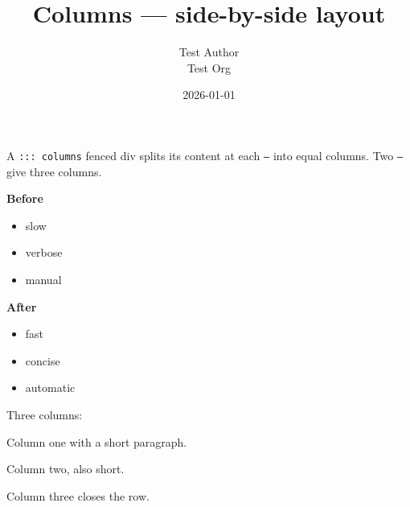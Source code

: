 \documentclass[11pt,a4paper]{article}
\title{Columns — side-by-side layout}
\author{Test Author \\ Test Org}
\date{2026-01-01}
\theoremstyle{definition}
\begin{document}
\maketitle

A \texttt{::: columns} fenced div splits its content at each \texttt{---} into equal
columns. Two \texttt{---} give three columns.


\textbf{Before}


\begin{itemize}
  \item slow
  \item verbose
  \item manual
\end{itemize}



\noindent\hrulefill\par


\textbf{After}


\begin{itemize}
  \item fast
  \item concise
  \item automatic
\end{itemize}


Three columns:


Column one with a short paragraph.



\noindent\hrulefill\par


Column two, also short.



\noindent\hrulefill\par


Column three closes the row.
\end{document}
